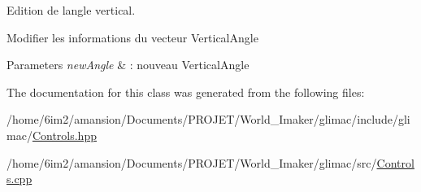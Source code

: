 Edition de l\textquotesingle{}angle vertical. 

Modifier les informations du vecteur Vertical\+Angle


\begin{DoxyParams}{Parameters}
{\em new\+Angle} & \+: nouveau Vertical\+Angle \\
\hline
\end{DoxyParams}


The documentation for this class was generated from the following files\+:\begin{DoxyCompactItemize}
\item 
/home/6im2/amansion/\+Documents/\+P\+R\+O\+J\+E\+T/\+World\+\_\+\+Imaker/glimac/include/glimac/\hyperlink{Controls_8hpp}{Controls.\+hpp}\item 
/home/6im2/amansion/\+Documents/\+P\+R\+O\+J\+E\+T/\+World\+\_\+\+Imaker/glimac/src/\hyperlink{Controls_8cpp}{Controls.\+cpp}\end{DoxyCompactItemize}
